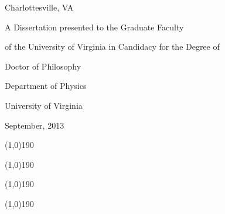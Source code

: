 \documentclass[12pt]{report}
\begin{document}
\thispagestyle{empty}
\begin{center}


\vspace{0.80in}

Charlottesville, VA

\vspace{1.25in}


{\small
A Dissertation presented to the Graduate Faculty

of the University of Virginia in Candidacy for the Degree of

Doctor of Philosophy

\vspace{0.35in}

Department of Physics

\vspace{0.35in}

University of Virginia

September, 2013
}

\vspace{0.5in}


\hfill \line(1,0){190}
\vspace{0.20in}

\hfill \line(1,0){190}
\vspace{0.20in}

\hfill \line(1,0){190}
\vspace{0.20in}

\hfill \line(1,0){190}


\end{center}
\end{document}
